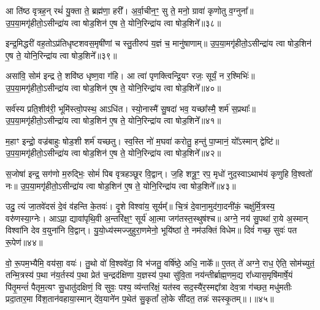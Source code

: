 आ ति॑ष्ठ वृत्रह॒न् रथं॑ यु॒क्ता ते॒ ब्रह्म॑णा॒ हरी᳚। अ॒र्वा॒चीन॒ꣳ॒ सु ते॒ मनो॒ ग्रावा॑ कृणोतु व॒ग्नुना᳚॥ उ॒प॒या॒मगृ॑हीतो॒\-ऽसीन्द्रा॑य त्वा षोड॒शिन॑ ए॒ष ते॒ योनि॒रिन्द्रा॑य त्वा षोड॒शिने᳚॥३८॥

{\anuvakamend[{आ ति॑ष्ठ॒ षड्विꣳ॑शतिः॥37॥}]}

इन्द्र॒मिद्धरी॑ वह॒तो\-ऽप्र॑तिधृष्टशवस॒मृषी॑णां च स्तु॒तीरुप॑ य॒ज्ञं च॒ मानु॑षाणाम्॥ उ॒प॒या॒मगृ॑हीतो॒\-ऽसीन्द्रा॑य त्वा षोड॒शिन॑ ए॒ष ते॒ योनि॒रिन्द्रा॑य त्वा षोड॒शिने᳚॥३९॥

{\anuvakamend[{इन्द्र॒मित्त्रयो॑विꣳशतिः॥38॥}]}

असा॑वि॒ सोम॑ इन्द्र ते॒ शवि॑ष्ठ धृष्ण॒वा ग॑हि। आ त्वा॑ पृणक्त्विन्द्रि॒यꣳ रजः॒ सूर्यं॒ न र॒श्मिभिः॑॥ उ॒प॒या॒मगृ॑हीतो॒\-ऽसीन्द्रा॑य त्वा षोड॒शिन॑ ए॒ष ते॒ योनि॒रिन्द्रा॑य त्वा षोड॒शिने᳚॥४०॥

{\anuvakamend[{असा॑वि स॒प्तविꣳ॑शतिः॥39॥}]}

सर्व॑स्य प्रति॒शीव॑री॒ भूमि॑स्त्वो॒पस्थ॒ आ\-ऽधि॑त। स्यो॒नास्मै॑ सु॒षदा॑ भव॒ यच्छा᳚स्मै॒ शर्म॑ स॒प्रथाः᳚॥ उ॒प॒या॒मगृ॑हीतो॒\-ऽसीन्द्रा॑य त्वा षोड॒शिन॑ ए॒ष ते॒ योनि॒रिन्द्रा॑य त्वा षोड॒शिने᳚॥४१॥

{\anuvakamend[{सर्व॑स्य॒ षड्विꣳ॑शतिः॥40॥}]}

म॒हाꣳ इन्द्रो॒ वज्र॑बाहुः षोड॒शी शर्म॑ यच्छतु। स्व॒स्ति नो॑ म॒घवा॑ करोतु॒ हन्तु॑ पा॒प्मानं॒ यो᳚\-ऽस्मान् द्वेष्टि॑॥ उ॒प॒या॒मगृ॑हीतो॒\-ऽसीन्द्रा॑य त्वा षोड॒शिन॑ ए॒ष ते॒ योनि॒रिन्द्रा॑य त्वा षोड॒शिने᳚॥४२॥

{\anuvakamend[{सर्व॑स्य म॒हान्थ्षड्विꣳ॑शति॒ष्षड्विꣳ॑शतिः॥41॥}]}

स॒जोषा॑ इन्द्र॒ सग॑णो म॒रुद्भिः॒ सोमं॑ पिब वृत्रहञ्छूर वि॒द्वान्। ज॒हि शत्रू॒ꣳ॒ रप॒ मृधो॑ नुद॒स्वा\-ऽथाभ॑यं कृणुहि वि॒श्वतो॑ नः॥ उ॒प॒या॒मगृ॑हीतो॒\-ऽसीन्द्रा॑य त्वा षोड॒शिन॑ ए॒ष ते॒ योनि॒रिन्द्रा॑य त्वा षोड॒शिने᳚॥४३॥

{\anuvakamend[{स॒जोषा᳚स्त्रि॒ꣳ॒शत्॥42॥}]}

उदु॒ त्यं जा॒तवे॑दसं दे॒वं व॑हन्ति के॒तवः॑। दृ॒शे विश्वा॑य॒ सूर्यम्᳚॥ चि॒त्रं दे॒वाना॒मुद॑गा॒दनी॑कं॒ चक्षु॑र्मि॒त्रस्य॒ वरु॑णस्या॒ग्नेः। आ\-ऽप्रा॒ द्यावा॑पृथि॒वी अ॒न्तरि॑क्ष॒ꣳ॒ सूर्य॑ आ॒त्मा जग॑तस्त॒स्थुष॑श्च॥ अग्ने॒ नय॑ सु॒पथा॑ रा॒ये अ॒स्मान् विश्वा॑नि देव व॒युना॑नि वि॒द्वान्। यु॒यो॒ध्य॑स्मज्जुहुरा॒णमेनो॒ भूयि॑ष्ठां ते॒ नम॑उक्तिं विधेम॥ दिवं॑ गच्छ॒ सुवः॑ पत रू॒पेण॑॥४४॥

वो॒ रू॒पम॒भ्यैमि॒ वय॑सा॒ वयः॑। तु॒थो वो॑ वि॒श्ववे॑दा॒ वि भ॑जतु॒ वर्\mbox{}षि॑ष्ठे॒ अधि॒ नाके᳚॥ ए॒तत् ते॑ अग्ने॒ राध॒ ऐति॒ सोम॑च्युतं॒ तन्मि॒त्रस्य॑ प॒था न॑य॒र्तस्य॑ प॒था प्रेत॑ च॒न्द्रद॑क्षिणा य॒ज्ञस्य॑ प॒था सु॑वि॒ता नय॑न्तीर्ब्राह्म॒णम॒द्य रा᳚ध्यास॒मृषि॑मार्\mbox{}षे॒यं पि॑तृ॒मन्तं॑ पैतृम॒त्यꣳ सु॒धातु॑दक्षिणं॒ वि सुवः॒ पश्य॒ व्य॑न्तरि॑क्षं॒ यत॑स्व सद॒स्यै॑र॒स्मद्दा᳚त्रा देव॒त्रा ग॑च्छत॒ मधु॑मतीः प्रदा॒तार॒मा वि॑श॒तान॑वहाया॒स्मान् दे॑व॒याने॑न प॒थेत॑ सु॒कृतां᳚ लो॒के सी॑दत॒ तन्नः॑ सꣴस्कृ॒तम्॥।॥४५॥

